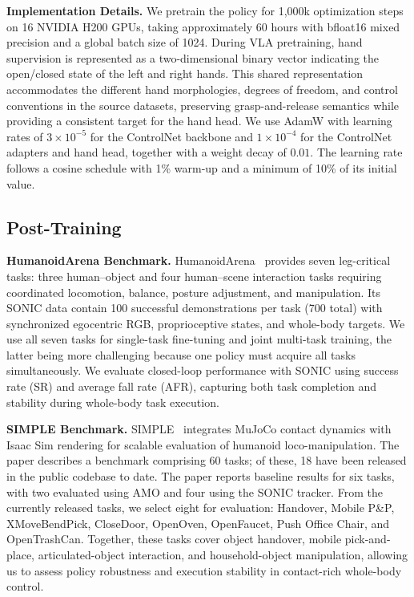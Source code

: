 \textbf{Implementation Details.} We pretrain the policy for 1,000k optimization steps on 16 NVIDIA H200 GPUs, taking approximately 60 hours with bfloat16 mixed precision and a global batch size of 1024. During VLA pretraining, hand supervision is represented as a two-dimensional binary vector indicating the open/closed state of the left and right hands. This shared representation accommodates the different hand morphologies, degrees of freedom, and control conventions in the source datasets, preserving grasp-and-release semantics while providing a consistent target for the hand head. We use AdamW with learning rates of $3\times10^{-5}$ for the ControlNet backbone and $1\times10^{-4}$ for the ControlNet adapters and hand head, together with a weight decay of $0.01$. The learning rate follows a cosine schedule with 1\% warm-up and a minimum of 10\% of its initial value.

\subsection{Post-Training}
\label{sec:setup_posttraining}
\textbf{HumanoidArena Benchmark.} HumanoidArena~\cite{humanoidarena,sonic} provides seven leg-critical tasks: three human--object and four human--scene interaction tasks requiring coordinated locomotion, balance, posture adjustment, and manipulation. Its SONIC data contain 100 successful demonstrations per task (700 total) with synchronized egocentric RGB, proprioceptive states, and whole-body targets. We use all seven tasks for single-task fine-tuning and joint multi-task training, the latter being more challenging because one policy must acquire all tasks simultaneously. We evaluate closed-loop performance with SONIC using success rate (SR) and average fall rate (AFR), capturing both task completion and stability during whole-body task execution.

\textbf{SIMPLE Benchmark.} SIMPLE~\cite{simple} integrates MuJoCo contact dynamics with Isaac Sim rendering for scalable evaluation of humanoid loco-manipulation. The paper describes a benchmark comprising 60 tasks; of these, 18 have been released in the public codebase to date. The paper reports baseline results for six tasks, with two evaluated using AMO and four using the SONIC tracker. From the currently released tasks, we select eight for evaluation: Handover, Mobile P\&P, XMoveBendPick, CloseDoor, OpenOven, OpenFaucet, Push Office Chair, and OpenTrashCan. Together, these tasks cover object handover, mobile pick-and-place, articulated-object interaction, and household-object manipulation, allowing us to assess policy robustness and execution stability in contact-rich whole-body control.

